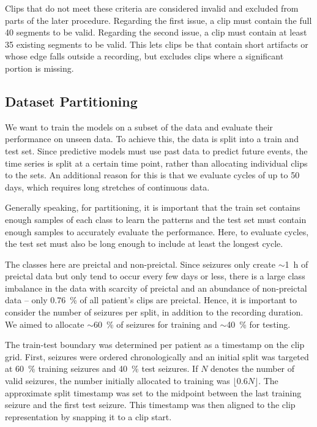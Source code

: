 Clips that do not meet these criteria are considered invalid and excluded from parts of the later procedure.
Regarding the first issue, a clip must contain the full 40 segments to be valid.
Regarding the second issue, a clip must contain at least 35 existing segments to be valid.
This lets clips be that contain short artifacts or whose edge falls outside a recording, but excludes clips where a significant portion is missing.

\subsection{Dataset Partitioning} \label{subsec:dataset-partitioning}
We want to train the models on a subset of the data and evaluate their performance on unseen data.
To achieve this, the data is split into a train and test set.
Since predictive models must use past data to predict future events, the time series is split at a certain time point, rather than allocating individual clips to the sets.
An additional reason for this is that we evaluate cycles of up to 50 days, which requires long stretches of continuous data.

Generally speaking, for partitioning, it is important that the train set contains enough samples of each class to learn the patterns and the test set must contain enough samples to accurately evaluate the performance.
Here, to evaluate cycles, the test set must also be long enough to include at least the longest cycle.

The classes here are preictal and non-preictal.
Since seizures only create $\sim$\SI{1}{\hour} of preictal data but only tend to occur every few days or less, there is a large class imbalance in the data with scarcity of preictal and an abundance of non-preictal data – only \SI{0.76}{\percent} of all patient's clips are preictal.
Hence, it is important to consider the number of seizures per split, in addition to the recording duration.
We aimed to allocate $\sim$\SI{60}{\percent} of seizures for training and $\sim$\SI{40}{\percent} for testing.

The train-test boundary was determined per patient as a timestamp on the clip grid.
First, seizures were ordered chronologically and an initial split was targeted at \SI{60}{\percent} training seizures and \SI{40}{\percent} test seizures.
If $N$ denotes the number of valid seizures, the number initially allocated to training was $\lfloor 0.6N \rfloor$.
The approximate split timestamp was set to the midpoint between the last training seizure and the first test seizure.
This timestamp was then aligned to the clip representation by snapping it to a clip start.

